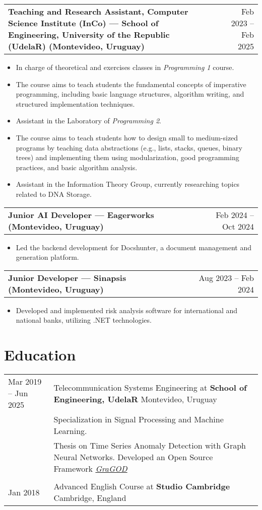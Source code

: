 \documentclass[a4paper,12pt]{article}
\makeatletter
\newenvironment{joblong}[2]
    {
    \begin{tabularx}{\linewidth}{@{}l X r@{}}
    \textbf{#1} & \hfill &  #2 \\[3.75pt]
    \end{tabularx}
    \begin{minipage}[t]{\linewidth}
    \begin{itemize}[nosep,after=\strut, leftmargin=1em, itemsep=3pt,label=--]
    }
    {
    \end{itemize}
    \end{minipage}    
    }
\makeatother
\begin{document}
\begin{joblong}{Teaching and Research Assistant, Computer Science Institute (InCo) — School of Engineering, University of the Republic (UdelaR) (Montevideo, Uruguay)}{Feb 2023 -- Feb 2025}
\item In charge of theoretical and exercises classes in \textit{Programming 1} course.
    \item The course aims to teach students the fundamental concepts of imperative programming, including basic language structures, algorithm writing, and structured implementation techniques.
\item Assistant in the Laboratory of \textit{Programming 2}.
    \item The course aims to teach students how to design small to medium-sized programs by teaching data abstractions (e.g., lists, stacks, queues, binary trees) and implementing them using modularization, good programming practices, and basic algorithm analysis.
\item Assistant in the Information Theory Group, currently researching topics related to DNA Storage.
\end{joblong}

\begin{joblong}{Junior AI Developer — Eagerworks (Montevideo, Uruguay)}{Feb 2024 -- Oct 2024}
\item Led the backend development for Docshunter, a document management and generation platform.
\end{joblong}

\begin{joblong}{Junior Developer — Sinapsis (Montevideo, Uruguay)}{Aug 2023 -- Feb 2024}
\item Developed and implemented risk analysis software for international and national banks, utilizing .NET technologies.
\end{joblong}
  

\section{Education}
\begin{tabularx}{\linewidth}{@{}l X@{}}	
Mar 2019 -- Jun 2025 & Telecommunication Systems Engineering at \textbf{School of Engineering, UdelaR} \hfill Montevideo, Uruguay \\
& Specialization in Signal Processing and Machine Learning. \\
& Thesis on Time Series Anomaly Detection with Graph Neural Networks. Developed an Open Source Framework \href{https://github.com/GraGODs/GraGOD}{\textit{GraGOD}} \\
\\
Jan 2018 & Advanced English Course at \textbf{Studio Cambridge} \hfill Cambridge, England \\
\end{tabularx}
\end{document}
